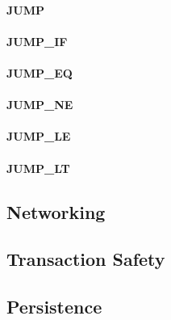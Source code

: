 \documentclass[12pt,a4paper]{article}
\begin{document}
\paragraph{JUMP}
\paragraph{JUMP\_IF}
\paragraph{JUMP\_EQ}
\paragraph{JUMP\_NE}
\paragraph{JUMP\_LE}
\paragraph{JUMP\_LT}

\subsection{Networking}\label{sec:networking}

\subsection{Transaction Safety}\label{sec:transaction_safety}

\subsection{Persistence}\label{sec:persistence}
\end{document}
